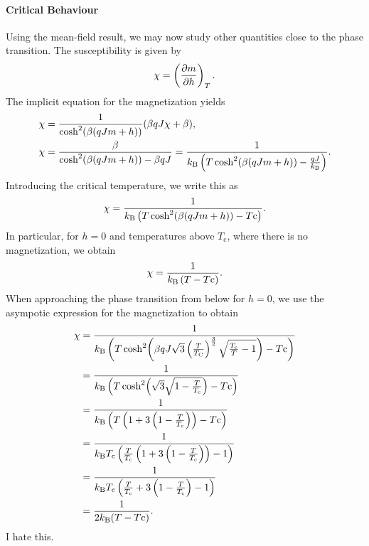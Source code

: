 \paragraph{Critical Behaviour}
Using the mean-field result, we may now study other quantities close to the phase transition. The susceptibility is given by
\begin{align*}
	\chi = \left(\pdv{m}{h}\right)_{T}.
\end{align*}
The implicit equation for the magnetization yields
\begin{align*}
	\chi &= \frac{1}{\cosh[2](\beta(qJm + h))}(\beta qJ\chi + \beta), \\
	\chi &= \frac{\beta}{\cosh[2](\beta(qJm + h)) - \beta qJ} = \frac{1}{k_{\text{B}} \left(T\cosh[2](\beta(qJm + h)) - \frac{qJ}{k_{\text{B}}}\right)}.
\end{align*}
Introducing the critical temperature, we write this as
\begin{align*}
	\chi = \frac{1}{k_{\text{B}} \left(T\cosh[2](\beta(qJm + h)) - T{\text{c}}\right)}.
\end{align*}
In particular, for $h = 0$ and temperatures above $T_{\text{c}}$, where there is no magnetization, we obtain
\begin{align*}
	\chi = \frac{1}{k_{\text{B}}\left(T - T{\text{c}}\right)}.
\end{align*}
When approaching the phase transition from below for $h = 0$, we use the asympotic expression for the magnetization to obtain
\begin{align*}
	\chi &= \frac{1}{k_{\text{B}} \left(T\cosh[2](\beta qJ\sqrt{3}\left(\frac{T}{T_{\text{C}}}\right)^{\frac{3}{2}}\sqrt{\frac{T_{\text{c}}}{T} - 1}) - T{\text{c}}\right)} \\
	     &= \frac{1}{k_{\text{B}} \left(T\cosh[2](\sqrt{3}\sqrt{1 - \frac{T}{T_{\text{c}}}}) - T{\text{c}}\right)} \\
	     &= \frac{1}{k_{\text{B}} \left(T\left(1 + 3\left(1 - \frac{T}{T_{\text{c}}}\right)\right) - T{\text{c}}\right)} \\
	     &= \frac{1}{k_{\text{B}} T_{\text{c}}\left(\frac{T}{T_{\text{c}}}\left(1 + 3\left(1 - \frac{T}{T_{\text{c}}}\right)\right) - 1\right)} \\
	     &= \frac{1}{k_{\text{B}} T_{\text{c}}\left(\frac{T}{T_{\text{c}}} + 3\left(1 - \frac{T}{T_{\text{c}}}\right) - 1\right)} \\
	     &= \frac{1}{2k_{\text{B}}(T - T{\text{c}})}.
\end{align*}
I hate this.

